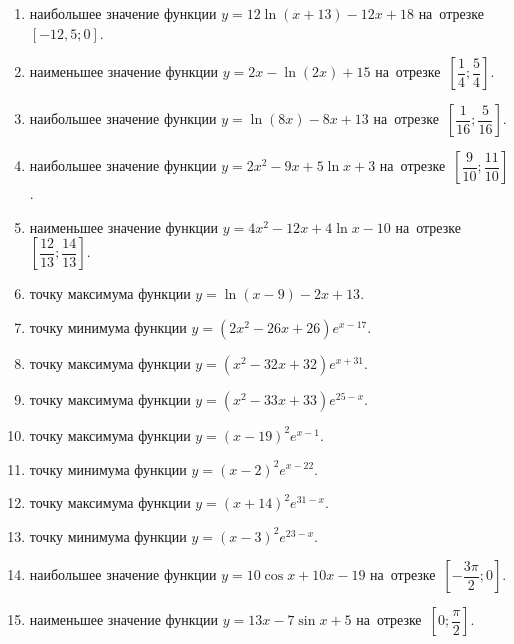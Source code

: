 \documentclass[a4paper,10pt]{article}
\begin{document}
\begin{enumerate}
\item {} наибольшее значение функции $y = 12\ln \left(x+13\right)-12x +18$ на~отрезке~$\left[-12,5;0\right]$.

\item {} наименьшее значение функции $y = 2x-\ln \left(2x\right)+15$ на~отрезке~$\left[\dfrac{1}{4};\dfrac{5}{4}\right]$.

\item {} наибольшее значение функции $y = \ln \left(8x\right)-8x+13$ на~отрезке~$\left[\dfrac{1}{16};\dfrac{5}{16}\right]$.

\item {} наибольшее значение функции $y=2x^2-9x+5\ln x+3$ на~отрезке~$\left[\dfrac{9}{10};\dfrac{11}{10}\right]$.

\item {} наименьшее значение функции $y=4x^2-12x+4\ln x-10$ на~отрезке~$\left[\dfrac{12}{13};\dfrac{14}{13}\right]$.

\item {} точку максимума функции $y=\ln \left(x-9\right)-2x+13$.

\item {} точку минимума функции $y=\left(2x^2-26x+26\right)e^{x-17}$.

\item {} точку максимума функции $y=\left(x^2-32x+32\right)e^{x+31}$.

\item {} точку максимума функции $y=\left(x^2-33x+33\right)e^{25-x}$.

\item {} точку максимума функции $y=\left(x -19\right)^2e^{x-1}$.

\item {} точку минимума функции $y=\left(x -2\right)^2e^{x-22}$.

\item {} точку максимума функции $y=\left(x +14\right)^2e^{31-x}$.

\item {} точку минимума функции $y=\left(x -3\right)^2e^{23-x}$.

\item {} наибольшее значение функции $y=10\cos x+10x -19$ на~отрезке~$\left[-\dfrac{3\pi }{2};0\right]$.

\item {} наименьшее значение функции $y=13x-7\sin x +5$ на~отрезке~$\left[0;\dfrac{\pi }{2}\right]$.


\end{enumerate}
\end{document}
